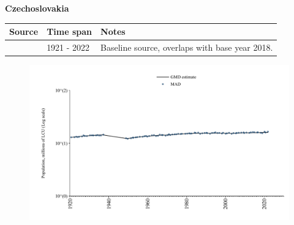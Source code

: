 \documentclass[12pt,a4paper,landscape]{article}
\begin{document}
\begin{adjustbox}{max totalsize={\paperwidth}{\paperheight},center}
\begin{minipage}[t][\textheight][t]{\textwidth}
\vspace*{0.5cm}
{}
\begin{center}
{\Large\bfseries Czechoslovakia}
\end{center}
\vspace{0.5cm}
\begin{table}[H]
\centering
\small
\begin{tabular}{|l|l|l|}
\hline
\textbf{Source} & \textbf{Time span} & \textbf{Notes} \\
\hline
\rowcolor{white}\cite{MAD}& 1921 - 2022 &Baseline source, overlaps with base year 2018.\\
\hline
\end{tabular}
\end{table}
\begin{figure}[H]
\centering
\includegraphics[width=\textwidth,height=0.6\textheight,keepaspectratio]{graphs/CSK_pop.pdf}
\end{figure}
\end{minipage}
\end{adjustbox}
\end{document}
